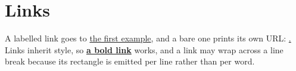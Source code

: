 \documentclass{article}
\begin{document}
\section{Links}

A labelled link goes to \href{https://example.org/one}{the first example},
and a bare one prints its own URL: \href{https://example.org/two}.
Links inherit style, so \textbf{\href{https://example.org/three}{a bold
link}} works, and a link may wrap across a line break because its rectangle
is emitted per line rather than per word.

\end{document}
